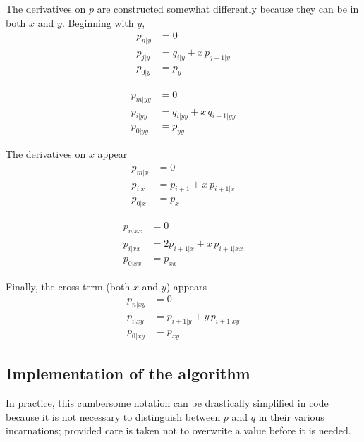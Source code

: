 \documentclass[twocolumn,letterpaper,11pt]{article}
\begin{document}
The derivatives on $p$ are constructed somewhat differently because they can be in both $x$ and $y$.  Beginning with $y$,
\begin{subequations}
\begin{align}
p_{n|y} &= 0\\
p_{j|y} &= q_{i|y} + x\,p_{j+1|y}\\
p_{0|y} &= p_y
\end{align}
\end{subequations}

\begin{subequations}
\begin{align}
p_{m|yy} &= 0\\
p_{i|yy} &= q_{i|yy} + x\,q_{i+1|yy}\\
p_{0|yy} &= p_{yy}
\end{align}
\end{subequations}

The derivatives on $x$ appear
\begin{subequations}
\begin{align}
p_{m|x} &= 0\\
p_{i|x} &= p_{i+1} + x\,p_{i+1|x}\\
p_{0|x} &= p_x
\end{align}
\end{subequations}

\begin{subequations}
\begin{align}
p_{n|xx} &= 0\\
p_{i|xx} &= 2 p_{i+1|x} + x\,p_{i+1|xx}\\
p_{0|xx} &= p_{xx}
\end{align}
\end{subequations}

Finally, the cross-term (both $x$ and $y$) appears
\begin{subequations}
\begin{align}
p_{n|xy} &= 0\\
p_{i|xy} &= p_{i+1|y} + y\,p_{i+1|xy}\\
p_{0|xy} &= p_{xy}
\end{align}
\end{subequations}

\subsection{Implementation of the algorithm}
In practice, this cumbersome notation can be drastically simplified in code because it is not necessary to distinguish between $p$ and $q$ in their various incarnations; provided care is taken not to overwrite a value before it is needed.
\end{document}
